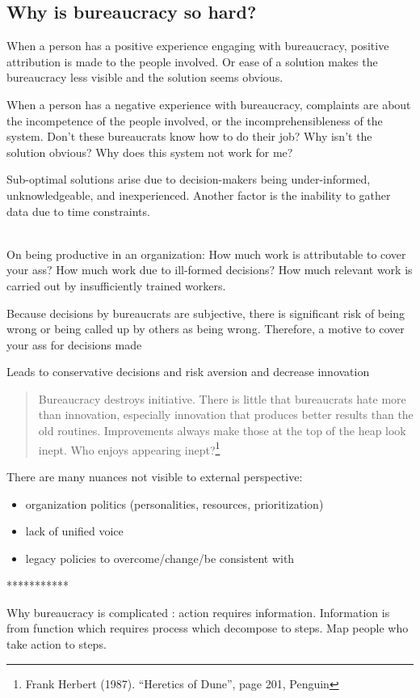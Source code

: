 \subsection{Why is bureaucracy so hard?}

When a person has a positive experience engaging with bureaucracy, positive attribution is made to the people involved. Or ease of a solution makes the bureaucracy less visible and the solution seems obvious. 


When a person has a negative experience with bureaucracy, complaints are about the incompetence of the people involved, or the incomprehensibleness of the system. Don't these bureaucrats know how to do their job? Why isn't the solution obvious? Why does this system not work for me?


Sub-optimal solutions arise due to decision-makers being under-informed, unknowledgeable, and inexperienced. Another factor is the inability to gather data due to time constraints.



\ \\

On being productive in an organization:
How much work is attributable to cover your ass? How much work due to ill-formed decisions? How much relevant work is carried out by insufficiently trained workers. 

Because decisions by bureaucrats are subjective, there is significant risk of being wrong or being called up by others as being wrong. Therefore, a motive to cover your ass for decisions made

Leads to conservative decisions and risk aversion and decrease innovation

\begin{quote}
Bureaucracy destroys initiative. There is little that bureaucrats hate more than innovation, especially innovation that produces better results than the old routines. Improvements always make those at the top of the heap look inept. Who enjoys appearing inept?\footnote{Frank Herbert (1987). ``Heretics of Dune'', page 201, Penguin}
\end{quote}

There are many nuances not visible to external perspective:
\begin{itemize}
    \item organization politics (personalities, resources, prioritization)
\item lack of unified voice
\item legacy policies to overcome/change/be consistent with
\end{itemize}

***********

Why bureaucracy is complicated : action requires information. Information is from function which requires process which decompose to steps. Map people who take action to steps.
